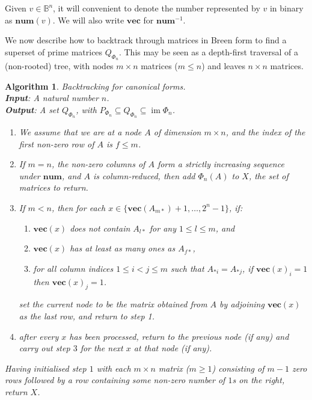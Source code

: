 \documentclass[11pt]{article}
\newtheorem{algo}[thm]{Algorithm}
\newenvironment{alg}{\begin{algo}\rm}{\end{algo}}
\numberwithin{equation}{section}
\DeclareMathOperator{\im}{im}
\newcommand{\num}{\mathbf{num}}
\newcommand{\vect}{\mathbf{vec}}
\newcommand{\B}{\mathbb{B}}
\begin{document}
Given $v \in \B^n$, it will convenient to denote the number represented by $v$
in binary as $\num(v)$. We will also write $\vect$ for $\mathbf{num}^{-1}$.

We now describe how to backtrack through matrices in Breen form to find a
superset of prime matrices $Q_{\Phi_n}$. This may be seen as a depth-first
traversal of a (non-rooted) tree, with nodes $m\times n$ matrices ($m \leq
n$) and leaves $n \times n$ matrices.

\begin{alg}
  Backtracking for canonical forms.\\
  \textbf{Input}: A natural number $n$. \\
  \textbf{Output}: A set $Q_{\Phi_n}$, with $P_{\Phi_n} \subseteq Q_{\Phi_n}
  \subseteq \im\Phi_n$.
  \begin{enumerate}
    \item We assume that we are at a node $A$ of dimension $m \times n$, and the
      index of the first non-zero row of $A$ is $f \leq m$. 
    \item If $m = n$, the non-zero columns of $A$ form a strictly increasing
      sequence under $\num$, and $A$ is column-reduced, then add $\Phi_n(A)$ to
      $X$, the set of matrices to return.
    \item If $m < n$, then for each $x \in \{\vect(A_{m*}) + 1,
        \ldots, 2^n - 1\}$, if:
      \begin{enumerate}[label={(\roman*)}]
        \item $\vect(x)$ does not contain $A_{l*}$ for any $1 \leq l \leq m$,
          and
        \item $\vect(x)$ has at least as many ones as $A_{f*}$,
        \item for all column indices $1 \leq i < j \leq m$ such that $A_{*i} =
          A_{*j}$, if $\vect(x)_i = 1$ then $\vect(x)_j = 1$.
      \end{enumerate}
      set the current node to be the matrix obtained from $A$ by adjoining
      $\vect(x)$ as the last row, and return to step 1.
    \item after every $x$ has been processed, return to the previous node (if
      any) and carry out step $3$ for the next $x$ at that node (if any).
  \end{enumerate}
  Having initialised step $1$ with each $m \times n$ matrix ($m \geq 1$)
  consisting of $m - 1$ zero rows followed by a row containing some non-zero
  number of $1$s on the right, return $X$.
\end{alg}
\end{document}
